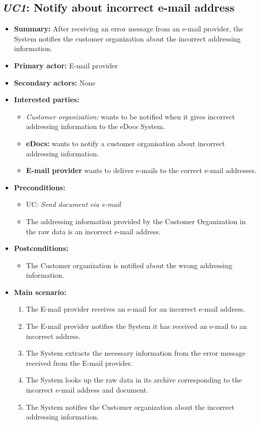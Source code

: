\documentclass[a4paper,10pt]{article}
\begin{document}
\subsection{\emph{UC1}: Notify about incorrect e-mail address}
\begin{itemize}
    \item \textbf{Summary:} After receiving an error message from an e-mail provider, the System notifies the customer organization about the incorrect addressing information.
    \item \textbf{Primary actor:} E-mail provider
	\item \textbf{Secondary actors:} None
    \item \textbf{Interested parties:} 
        \begin{itemize}
            \item \textit{Customer organization:} wants to be notified when it gives incorrect addressing information to the eDocs System.
            \item \textbf{eDocs:} wants to notify a customer organisation about incorrect addressing information.
            \item \textbf{E-mail provider} wants to deliver e-mails to the correct e-mail addresses.
        \end{itemize}

    \item \textbf{Preconditions:}
        \begin{itemize}
            \item UC: \emph{Send document via e-mail}
            \item The addressing information provided by the Customer Organization in the raw data is an incorrect e-mail address.
        \end{itemize}

    \item \textbf{Postconditions:}
        \begin{itemize}
            \item The Customer organization is notified about the wrong addressing information.
        \end{itemize}
        
    \item \textbf{Main scenario:} 
    \begin{enumerate}
       \item The E-mail provider receives an e-mail for an incorrect e-mail address.
       \item The E-mail provider notifies the System it has received an e-mail to an incorrect address.
       \item The System extracts the necessary information from the error message received from the E-mail provider.
       \item The System looks up the raw data in its archive corresponding to the incorrect e-mail address and document.
       \item The System notifies the Customer organization about the incorrect addressing information.
    \end{enumerate}

\end{itemize}
\end{document}
